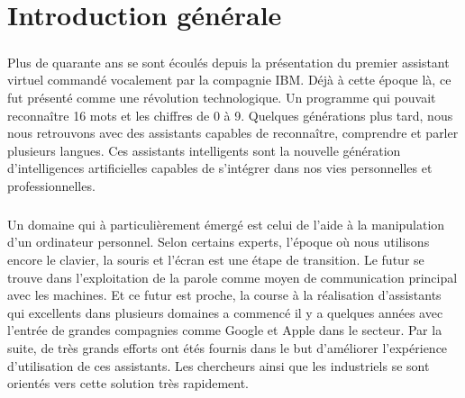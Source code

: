 \chapter*{Introduction générale}
\paragraph{}

\paragraph{}
Plus de quarante ans se sont écoulés depuis la présentation du premier assistant virtuel commandé vocalement par la compagnie IBM. Déjà à cette époque là, ce fut présenté comme une révolution technologique. Un programme qui pouvait reconnaître 16 mots et les chiffres de 0 à 9. Quelques générations plus tard, nous nous retrouvons avec des assistants capables de reconnaître, comprendre et parler plusieurs langues. Ces assistants intelligents sont la nouvelle génération d'intelligences artificielles capables de s'intégrer dans nos vies personnelles et professionnelles. 

\paragraph{}
Un domaine qui à particulièrement émergé est celui de l'aide à la manipulation d'un ordinateur personnel. Selon certains experts, l'époque où nous utilisons encore le clavier, la souris et l'écran est une étape de transition. Le futur se trouve dans l'exploitation de la parole comme moyen de communication principal avec les machines. Et ce futur est proche, la course à la réalisation d'assistants qui excellents dans plusieurs domaines a commencé il y a quelques années avec l'entrée de grandes compagnies comme Google et Apple dans le secteur. Par la suite, de très grands efforts ont étés fournis dans le but d'améliorer l'expérience d'utilisation de ces assistants. Les chercheurs ainsi que les industriels se sont orientés vers cette solution très rapidement.


